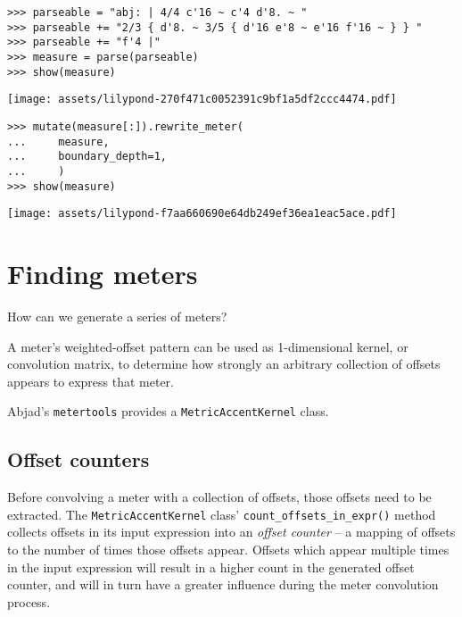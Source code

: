 \begin{singlespacing}
\vspace{-0.5\baselineskip}
\begin{lstlisting}
>>> parseable = "abj: | 4/4 c'16 ~ c'4 d'8. ~ "
>>> parseable += "2/3 { d'8. ~ 3/5 { d'16 e'8 ~ e'16 f'16 ~ } } "
>>> parseable += "f'4 |"
>>> measure = parse(parseable)
>>> show(measure)
\end{lstlisting}
\noindent\texttt{[image: assets/lilypond-270f471c0052391c9bf1a5df2ccc4474.pdf]}
\end{singlespacing}

\begin{comment}
<abjad>
mutate(measure[:]).rewrite_meter(
    measure,
    boundary_depth=1,
    )
show(measure)
</abjad>
\end{comment}

\begin{singlespacing}
\vspace{-0.5\baselineskip}
\begin{lstlisting}
>>> mutate(measure[:]).rewrite_meter(
...     measure,
...     boundary_depth=1,
...     )
>>> show(measure)
\end{lstlisting}
\noindent\texttt{[image: assets/lilypond-f7aa660690e64db249ef36ea1eac5ace.pdf]}
\end{singlespacing}

\section{Finding meters}

How can we generate a series of meters?

A meter's weighted-offset pattern can be used as 1-dimensional kernel, or
convolution matrix, to determine how strongly an arbitrary collection of
offsets appears to express that meter.

Abjad's \texttt{metertools} provides a \texttt{MetricAccentKernel} class.

\subsection{Offset counters} %

Before convolving a meter with a collection of offsets, those offsets need to
be extracted. The \texttt{MetricAccentKernel} class'
\texttt{count\_offsets\_in\_expr()} method collects offsets in its input
expression into an \emph{offset counter} -- a mapping of offsets to the number
of times those offsets appear. Offsets which appear multiple times in the input
expression will result in a higher count in the generated offset counter, and
will in turn have a greater influence during the meter convolution process.

